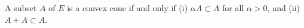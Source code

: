 A subset $A$ of $E$ is a convex cone if and only if (i) $\alpha A \subset A$ for all $\alpha > 0$, and (ii) $A + A \subset A$.